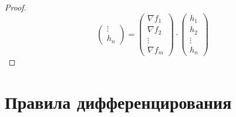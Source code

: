 \documentclass[12pt]{article}
\theoremstyle{definition}
\begin{document}
\begin{proof}
$$\begin{pmatrix}
			\vdots\\
			h_n
		\end{pmatrix} = 
		\begin{pmatrix}
			\nabla f_1 \\
			\nabla f_2 \\
			\vdots \\
			\nabla f_m
		\end{pmatrix}{\cdot}
		\begin{pmatrix}
			h_1\\
			h_2\\
			\vdots\\
			h_n
		\end{pmatrix}
	$$ 
\end{proof}

\newpage
\section*{Правила дифференцирования}
\end{document}
